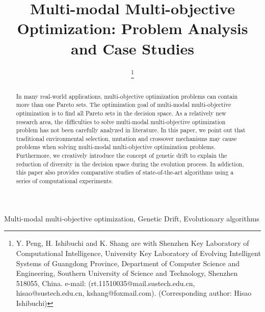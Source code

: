 \documentclass[conference]{IEEEtran}
\begin{document}
\title{Multi-modal Multi-objective Optimization: Problem Analysis and Case Studies
}
\author{
\thanks{Y. Peng, H. Ishibuchi and K. Shang are with Shenzhen Key Laboratory of Computational Intelligence, University Key Laboratory of Evolving Intelligent Systems of Guangdong Province, Department of Computer Science and Engineering, Southern University of Science and Technology, Shenzhen 518055, China. e-mail: (rt.11510035@mail.sustech.edu.cn, hisao@sustech.edu.cn, kshang@foxmail.com). (Corresponding author: Hisao Ishibuchi)}
}

\maketitle

\begin{abstract}
In many real-world applications, multi-objective optimization problems can contain more than one Pareto sets. The optimization goal of multi-modal multi-objective optimization is to find all Pareto sets in the decision space. As a relatively new research area, the difficulties to solve multi-modal multi-objective optimization problem has not been carefully analyzed in literature. In this paper, we point out that traditional environmental selection, mutation and crossover mechanisms may cause problems when solving multi-modal multi-objective optimization problems. Furthermore, we creatively introduce the concept of genetic drift to explain the reduction of diversity in the decision space during the evolution process. In addiction, this paper also provides comparative studies of state-of-the-art algorithms using a series of computational experiments.
\end{abstract}

\begin{IEEEkeywords}
Multi-modal multi-objective optimization, Genetic Drift, Evolutionary algorithms
\end{IEEEkeywords}
\end{document}
